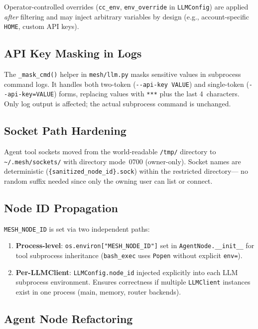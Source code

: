 \documentclass[11pt,a4paper]{article}
\newcommand{\code}[1]{\texttt{#1}}
\begin{document}
\noindent
Operator-controlled overrides (\code{cc\_env}, \code{env\_override} in
\code{LLMConfig}) are applied \emph{after} filtering and may inject
arbitrary variables by design (e.g., account-specific \code{HOME},
custom API keys).

\subsection{API Key Masking in Logs}

The \code{\_mask\_cmd()} helper in \code{mesh/llm.py} masks sensitive
values in subprocess command logs. It handles both two-token
(\code{-{}-api-key VALUE}) and single-token (\code{-{}-api-key=VALUE})
forms, replacing values with \code{***} plus the last 4~characters.
Only log output is affected; the actual subprocess command is unchanged.

\subsection{Socket Path Hardening}

Agent tool sockets moved from the world-readable \code{/tmp/} directory
to \code{\textasciitilde/.mesh/sockets/} with directory mode~0700
(owner-only). Socket names are deterministic
(\code{\{sanitized\_node\_id\}.sock}) within the restricted directory---
no random suffix needed since only the owning user can list or connect.

\subsection{Node ID Propagation}

\code{MESH\_NODE\_ID} is set via two independent paths:
\begin{enumerate}[nosep]
  \item \textbf{Process-level}: \code{os.environ["MESH\_NODE\_ID"]}
        set in \code{AgentNode.\_\_init\_\_} for tool subprocess
        inheritance (\code{bash\_exec} uses \code{Popen} without
        explicit \code{env=}).
  \item \textbf{Per-LLMClient}: \code{LLMConfig.node\_id} injected
        explicitly into each LLM subprocess environment. Ensures
        correctness if multiple \code{LLMClient} instances exist in one
        process (main, memory, router backends).
\end{enumerate}

\subsection{Agent Node Refactoring}
\end{document}
